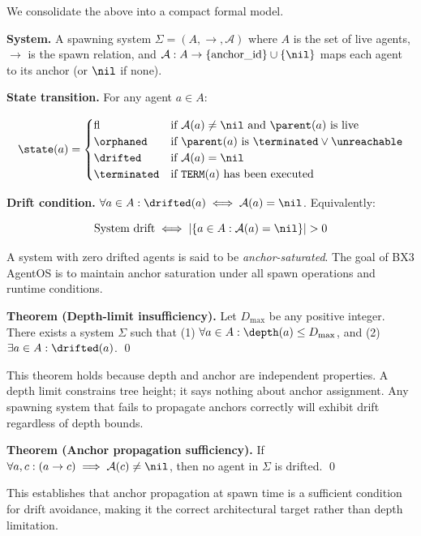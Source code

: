 We consolidate the above into a compact formal model.

\medskip
\noindent\textbf{System.} A spawning system $\Sigma = (A, \rightarrow, \mathcal{A})$ where $A$ is the set of live agents, $\rightarrow$ is the spawn relation, and $\mathcal{A}: A \rightarrow \{\text{anchor\_id}\} \cup \{\nil\}$ maps each agent to its anchor (or $\nil$ if none).

\medskip
\noindent\textbf{State transition.} For any agent $a \in A$:

\begin{equation}
\state(a) = 
\begin{cases}
\active & \text{if } \mathcal{A}(a) \neq \nil \text{ and } \parent(a) \text{ is live} \\
\orphaned & \text{if } \parent(a) \text{ is } \terminated \lor \unreachable \\
\drifted & \text{if } \mathcal{A}(a) = \nil \\
\terminated & \text{if } \texttt{TERM}(a) \text{ has been executed}
\end{cases}
\end{equation}

\medskip
\noindent\textbf{Drift condition.} $\forall a \in A: \drifted(a) \iff \mathcal{A}(a) = \nil$. Equivalently:

\begin{equation}
\text{System drift} \iff \left| \{ a \in A : \mathcal{A}(a) = \nil \} \right| > 0
\end{equation}

A system with zero drifted agents is said to be \emph{anchor-saturated}. The goal of BX3 AgentOS is to maintain anchor saturation under all spawn operations and runtime conditions.

\medskip
\noindent\textbf{Theorem (Depth-limit insufficiency).} Let $D_{\max}$ be any positive integer. There exists a system $\Sigma$ such that (1) $\forall a \in A: \depth(a) \leq D_{\max}$, and (2) $\exists a \in A: \drifted(a)$. \qed

This theorem holds because depth and anchor are independent properties. A depth limit constrains tree height; it says nothing about anchor assignment. Any spawning system that fails to propagate anchors correctly will exhibit drift regardless of depth bounds.

\medskip
\noindent\textbf{Theorem (Anchor propagation sufficiency).} If $\forall a, c: (a \rightarrow c) \implies \mathcal{A}(c) \neq \nil$, then no agent in $\Sigma$ is drifted. \qed

This establishes that anchor propagation at spawn time is a sufficient condition for drift avoidance, making it the correct architectural target rather than depth limitation.